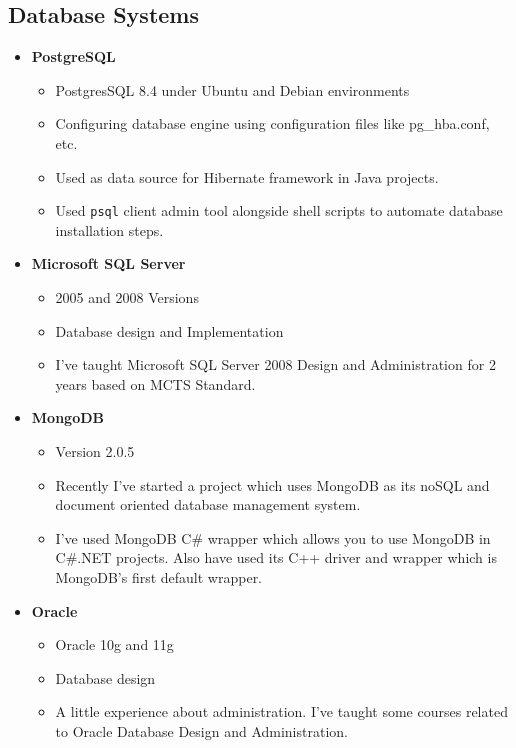 \documentclass[12pt,a4paper]{article}
\begin{document}
	\subsection{Database Systems}
		\begin{itemize}
			\item \textbf{PostgreSQL}
				\begin{itemize}
					\item PostgresSQL 8.4 under Ubuntu and Debian environments
					\item Configuring database engine using configuration files like pg\_hba.conf, etc.
					\item Used as data source for Hibernate framework in Java projects.
					\item Used \texttt{psql} client admin tool alongside shell scripts to automate database installation steps.
				\end{itemize}
			\item \textbf{Microsoft SQL Server}
				\begin{itemize}
					\item 2005 and 2008 Versions
					\item Database design and Implementation
					\item I've taught Microsoft SQL Server 2008 Design and Administration for 2 years based on MCTS Standard.
				\end{itemize}
			\item \textbf{MongoDB}
				\begin{itemize}
					\item Version 2.0.5
					\item Recently I've started a project which uses MongoDB as its noSQL and document oriented database management system.
					\item I've used MongoDB C\# wrapper which allows you to use MongoDB in C\#.NET projects. Also have used its C++ driver and wrapper which is MongoDB's first default wrapper.
				\end{itemize}
			\item \textbf{Oracle}
				\begin{itemize}
					\item Oracle 10g and 11g
					\item Database design
					\item A little experience about administration. I've taught some courses related to Oracle Database Design and Administration.
				\end{itemize}
		\end{itemize}
	
\end{document}
